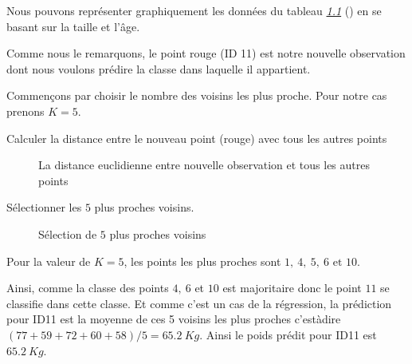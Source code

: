 \documentclass[letterpaper,11pt,english]{sphinxmanual}
\begin{document}
\sphinxAtStartPar
Nous pouvons représenter graphiquement les données du tableau
{\hyperref[\detokenize{chapter3:tab:rrr}]{\emph{1.1}}} () en se basant sur la taille et l’âge.

\begin{figure}[H]
\centering

\noindent{}
\end{figure}

\sphinxAtStartPar
Comme nous le remarquons, le point rouge (ID 11) est notre nouvelle
observation dont nous voulons prédire la classe dans laquelle il
appartient.

\sphinxAtStartPar
{} Commençons par choisir le nombre des voisins les plus
proche. Pour notre cas prenons \(K=5\).

\sphinxAtStartPar
{} Calculer la distance entre le nouveau point (rouge) avec
tous les autres points

\begin{figure}[H]
\centering
\capstart

\noindent{}
\caption{La distance euclidienne entre nouvelle observation et tous les autres
points}\label{\detokenize{chapter3:id12}}\end{figure}

\sphinxAtStartPar
{} Sélectionner les \(5\) plus proches voisins.

\begin{figure}[H]
\centering
\capstart

\noindent{}
\caption{Sélection de \(5\) plus proches voisins}\label{\detokenize{chapter3:id13}}\end{figure}

\sphinxAtStartPar
{} Pour la valeur de \(K=5\), les points les plus proches
sont \(1,\ 4,\ 5,\ 6\text{ et } 10.\)

\sphinxAtStartPar
{} Ainsi, comme la classe des points \(4,\ 6\) et
\(10\) est majoritaire donc le point \(11\) se classifie dans
cette classe. Et comme c’est un cas de la régression, la prédiction pour
ID11 est la moyenne de ces 5 voisins les plus proches c’est\sphinxhyphen{}à\sphinxhyphen{}dire
\((77+59+72+60+58)/5=65.2\ Kg\). Ainsi le poids prédit pour ID11 est
\(65.2\ Kg\).
\end{document}

